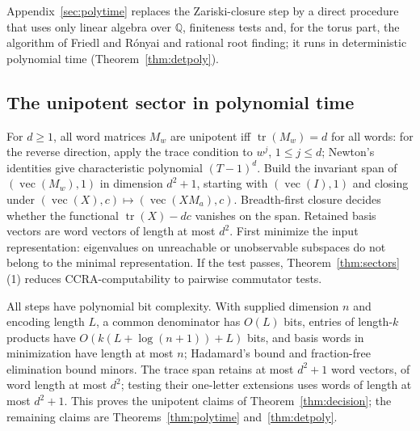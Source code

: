 \documentclass[11pt,letterpaper]{article}
\newcommand{\Q}{\mathbb{Q}}
\newcommand{\tr}{\operatorname{tr}}
\newcommand{\vecop}{\operatorname{vec}}
\theoremstyle{definition}
\begin{document}
Appendix~\ref{sec:polytime} replaces the Zariski-closure step by a direct procedure that uses only linear algebra over $\Q$, finiteness tests and, for the torus part, the algorithm of Friedl and R\'onyai and rational root finding; it runs in deterministic polynomial time (Theorem~\ref{thm:detpoly}).

\subsection{The unipotent sector in polynomial time}
For $d\ge1$, all word matrices $M_w$ are unipotent iff $\tr(M_w)=d$ for all words: for the reverse direction, apply the trace condition to $w^j$, $1\le j\le d$; Newton's identities give characteristic polynomial $(T-1)^d$. Build the invariant span of $(\vecop(M_w),1)$ in dimension $d^2+1$, starting with $(\vecop(I),1)$ and closing under $(\vecop(X),c)\mapsto(\vecop(XM_a),c)$. Breadth-first closure decides whether the functional $\tr(X)-dc$ vanishes on the span. Retained basis vectors are word vectors of length at most $d^2$. First minimize the input representation: eigenvalues on unreachable or unobservable subspaces do not belong to the minimal representation. If the test passes, Theorem~\ref{thm:sectors}(1) reduces CCRA-computability to pairwise commutator tests.

All steps have polynomial bit complexity. With supplied dimension $n$ and encoding length $L$, a common denominator has $O(L)$ bits, entries of length-$k$ products have $O(k(L+\log(n+1))+L)$ bits, and basis words in minimization have length at most $n$; Hadamard's bound and fraction-free elimination bound minors. The trace span retains at most $d^2+1$ word vectors, of word length at most $d^2$; testing their one-letter extensions uses words of length at most $d^2+1$. This proves the unipotent claims of Theorem~\ref{thm:decision}; the remaining claims are Theorems~\ref{thm:polytime} and~\ref{thm:detpoly}.
\end{document}
